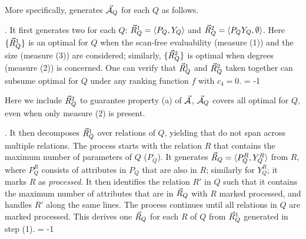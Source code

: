 

More specifically, \usc generates $\vec{{\mathcal A}}_{Q}$ for each $Q$ as follows.

. It first generates two \bss for each $Q$:
$\vec{R}_{Q}^{1} = \langle P_{Q},\allowbreak Y_{Q}\rangle$ and $\vec{R}_{Q}^{2} =
\langle P_{Q}Y_{Q},\allowbreak \emptyset\rangle$. Here $\{\vec{R}_{Q}^{1}\}$ is
an optimal \bds for $Q$ when the scan-free evaluability (measure
(1))
and the size (measure (3)) are considered; similarly,
$\{\vec{R}_{Q}^{2}\}$ is optimal when degrees (measure (2)) is
concerned.
One can verify that $\vec{R}_{Q}^{1}$ and $\vec{R}_{Q}^{2}$ taken
together can subsume optimal \bdss for $Q$ under any ranking
function $f$ with $c_{4} = 0$.
\looseness = -1

\vspace{0.36ex}
Here we include $\vec{R}_{Q}^{2}$ %
to guarantee property (a)
of $\vec{{\mathcal A}}$, %
\ie $\vec{{\mathcal A}}_{Q}$ %
covers all optimal
\bdss for $Q$, even when only
measure (2) is present.



\vspace{0.36ex}

. It then decomposes $\vec{R}_{Q}^{1}$ over relations of
$Q$, yielding \bss that do not span across multiple relations. The
process starts with the relation $R$ that contains the maximum
number of parameters of $Q$ (\ie $P_{Q}$). It generates
$\vec{R}_{Q} = \langle P_{Q}^{R},\allowbreak Y_{Q}^{R}\rangle$ from $R$, where
$P_{Q}^{R}$ consists of attributes in $P_{Q}$ that are also in
$R$; similarly for $Y_{Q}^{R}$; it marks $R$ as {\em processed}.
It then identifies the relation $R'$ in $Q$ such that
  it contains the maximum
number of attributes that are in \bss $\vec{R}_{Q}$ with $R$
marked processed, and handles $R'$ along the same lines. The
process continues until all relations in $Q$ are marked
processed. This derives one \bs $\vec{R}_{Q}$ for each $R$ of $Q$
from $\vec{R}_{Q}^{1}$ generated in step (1). \looseness = -1

